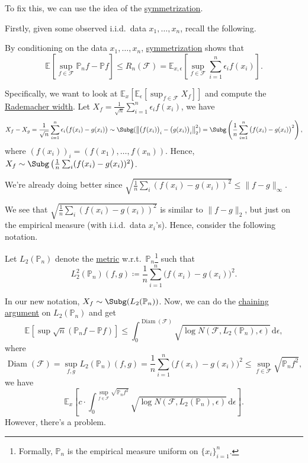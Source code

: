 \begin{intuition}
	To fix this, we can use the idea of the \hyperref[lma:symmetrization]{symmetrization}.
\end{intuition}

Firstly, given some observed i.i.d.\ data \(x_1, \dots , x_n\), recall the following.

\begin{prev}
	By conditioning on the data \(x_1, \dots , x_n\), \hyperref[lma:symmetrization]{symmetrization} shows that
	\[
		\mathbb{E}_{}\left[\sup _{f\in \mathscr{F} } \mathbb{P} _n f - \mathbb{P} f \right]
		\leq R_n(\mathscr{\mathscr{F} } )
		= \mathbb{E}_{x, \epsilon }\left[ \sup _{f\in \mathscr{F} } \sum_{i=1}^{n} \epsilon _i f(x_i) \right] .
	\]
\end{prev}

Specifically, we want to look at \(\mathbb{E}_{x}\left[\mathbb{E}_{\epsilon }\left[ \sup _{f\in \mathscr{F} } X_f \right] \right]\) and compute the \hyperref[def:Rademacher-width]{Rademacher width}. Let \(X_f = \frac{1}{\sqrt{n} } \sum_{i=1}^{n} \epsilon _i f(x_i)\), we have
\[
	X_f - X_g
	= \frac{1}{\sqrt{n} } \sum_{i=1}^{n} \epsilon _i \big(f(x_i) - g(x_i)\big)
	\sim \Subg(\left\lVert \big(f(x_i)\big)_i - \big(g(x_i)\big)_i \right\rVert _2^2)
	= \Subg\left( \frac{1}{n}\sum_{i=1}^{n} \big(f(x_i) - g(x_i)\big)^2 \right) ,
\]
where \((f(x_i))_i = (f(x_1), \dots , f(x_n))\). Hence, \(X_f \sim \Subg\left( \frac{1}{n}\sum_{i} (f(x_i) - g(x_i))^2 \right) \).

\begin{note}
	We're already doing better since \(\sqrt{\frac{1}{n}\sum_{i} (f(x_i) - g(x_i))^2} \leq \lVert f - g \rVert _\infty \).
\end{note}

We see that \(\sqrt{\frac{1}{n}\sum_{i} (f(x_i) - g(x_i))^2}\) is similar to \(\lVert f - g \rVert _2\), but just on the empirical measure (with i.i.d.\ data \(x_i\)'s). Hence, consider the following notation.

\begin{notation}
	Let \(L_2(\mathbb{P} _n)\) denote the \hyperref[def:pseudo-metric]{metric} w.r.t.\ \(\mathbb{P} _n\)\footnote{Formally, \(\mathbb{P} _n\) is the empirical measure uniform on \(\{ x_i \} _{i=1}^n\).} such that
	\[
		L_2^2(\mathbb{P} _n) (f, g) \coloneqq \frac{1}{n}\sum_{i=1}^{n} \big(f(x_i) - g(x_i)\big)^2.
	\]
\end{notation}

In our new notation, \(X_f \sim \Subg(L_2(\mathbb{P} _n))\). Now, we can do the \hyperref[note:chaining]{chaining argument} on \(L_2(\mathbb{P} _n)\) and get
\[
	\mathbb{E}_{}\left[\sup \sqrt{n} (\mathbb{P} _n f - \mathbb{P} f) \right]
	\leq \int_{0}^{\mathop{\mathrm{Diam}}(\mathscr{F} ) } \sqrt{\log N(\mathscr{F} , L_2(\mathbb{P} _n), \epsilon )} \,\mathrm{d}\epsilon ,
\]
where
\[
	\mathop{\mathrm{Diam}}(\mathscr{F} )
	= \sup _{f, g} L_2(\mathbb{P} _n)(f, g) = \frac{1}{n} \sum_{i=1}^{n} \big(f(x_i) - g(x_i)\big)^2
	\leq \sup _{f\in \mathscr{F} } \sqrt{\mathbb{P} _n f^2},
\]
we have
\[
	\mathbb{E}_{x}\left[ c\cdot \int_{0}^{\sup \limits_{f\in \mathscr{F} } \sqrt{\mathbb{P} _n f^2} } \sqrt{\log N(\mathscr{F} , L_2(\mathbb{P} _n), \epsilon )} \,\mathrm{d}\epsilon \right].
\]
However, there's a problem.

